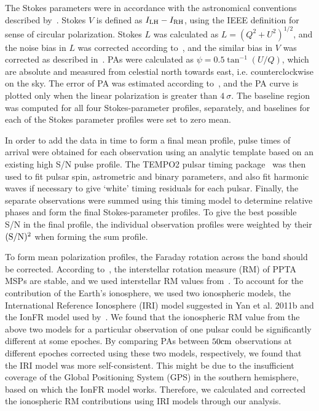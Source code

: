 \documentclass[useAMS,usenatbib]{mn2e}
\begin{document}
The Stokes parameters were in accordance with the astronomical conventions described 
by~\citet{vanStraten10}. Stokes $V$ is defined as $I_{\rm{LH}}-I_{\rm{RH}}$, 
using the IEEE definition for sense of circular polarization. 
%
Stokes $L$ was calculated as $L=(Q^2+U^2)^{1/2}$, and the noise bias in $L$ 
was corrected according to~\citet{Lorimer05}, and the similar bias in 
$V$ was corrected as described in~\citet{Yan11}.
%
PAs were calculated as $\psi=0.5\tan^{-1}(U/Q)$, which are absolute 
and measured from celestial north towards east, i.e. counterclockwise on the sky.
%
The error of PA was estimated according to~\citet{Everett01}, and 
the PA curve is plotted only when the linear polarization is greater than 
$4\ \sigma$.
%
The baseline region was computed for all four Stokes-parameter profiles, separately, 
and baselines for each of the Stokes parameter profiles were set to zero mean.
%

In order to add the data in time to form a final mean profile, pulse times of arrival 
were obtained for each observation using an analytic template based on an existing 
high S/N pulse profile. The TEMPO2 pulsar timing package~\citep{Hobbs06}  
was then used to fit pulsar spin, astrometric and binary parameters, and also fit 
harmonic waves if necessary to give ‘white’ timing residuals for each pulsar. Finally, 
the separate observations were summed using this timing model to determine relative 
phases and form the final Stokes-parameter profiles. To give the best possible S/N 
in the final profile, the individual observation profiles were weighted by their
$(\rm{S/N})^2$ when forming the sum profile. 

To form mean polarization profiles, the Faraday rotation across the band should be 
corrected. 
%
According to~\citet{Yan11b}, the interstellar rotation measure (RM) of PPTA MSPs are 
stable, and we used interstellar RM values from~\citet{Yan11}.
%
To account for the contribution of the Earth's ionosphere, we used two ionospheric 
models, the International Reference Ionosphere (IRI) model suggested in Yan et al. 2011b 
and the IonFR model used by~\citet{Sotomayor13}. 
%
We found that the ionospheric RM value from the above two models for a particular 
observation of one pulsar could be significantly different at some epoches. By 
comparing PAs between $50\rm{cm}$ observations at different epoches corrected using 
these two models, respectively, we found that the IRI model was more self-consistent. 
%
This might be due to the insufficient coverage of the Global Positioning System (GPS) in 
the southern hemisphere, based on which the IonFR model works.
%
Therefore, we calculated and corrected the ionospheric RM contributions using IRI models 
through our analysis.
%
\end{document}
